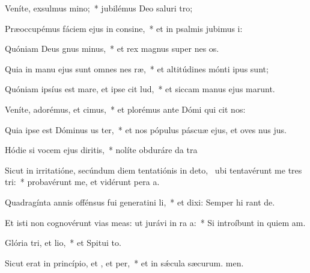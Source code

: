 \item Veníte, exsulmus mino;~* jubilémus Deo saluri tro;
\item Præoccupémus fáciem ejus in consine,~* et in psalmis jubimus i:
\item Quóniam Deus gnus minus,~* et rex magnus super nes os.
\item Quia in manu ejus sunt omnes nes ræ,~* et altitúdines mónti ipus sunt;
\item Quóniam ipsíus est mare, et ipse cit lud,~* et siccam manus ejus marunt.
\item Veníte, adorémus, et cimus,~* et plorémus ante Dómi qui cit nos:
\item Quia ipse est Dóminus us ter,~* et nos pópulus páscuæ ejus, et oves nus jus.
\item Hódie si vocem ejus diritis,~* nolíte obduráre da tra
\item Sicut in irritatióne, secúndum diem tentatiónis in deto,~\pscross{} ubi tentavérunt me tres tri:~* probavérunt me, et vidérunt pera a.
\item Quadragínta annis offénsus fui generatini li,~* et dixi: Semper hi rant de.
\item Et isti non cognovérunt vias meas: ut jurávi in ra a:~* Si introíbunt in quiem am.
\item Glória tri, et lio,~* et Spitui to.
\item Sicut erat in princípio, et , et per,~* et in sǽcula sæcurum. men.
